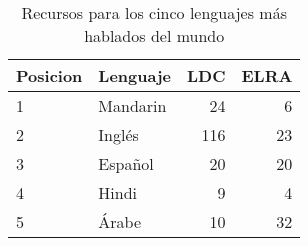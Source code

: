 \begin{table}[H]
\centering
\caption{Recursos para los cinco lenguajes más hablados del mundo \cite{HernndezMena2017}}
\label{tab:resources_by_langauge}
\begin{tabular}{|l|l|r|r|} %
\hline
Posicion & Lenguaje & LDC & ELRA \\ \hline
1    & Mandarin & 24  & 6    \\ \hline
2    & Inglés  & 116 & 23   \\ \hline
3    & Español  & 20  & 20   \\ \hline
4    & Hindi    & 9   & 4    \\ \hline
5    & Árabe   & 10  & 32   \\ \hline
\end{tabular}
\end{table}